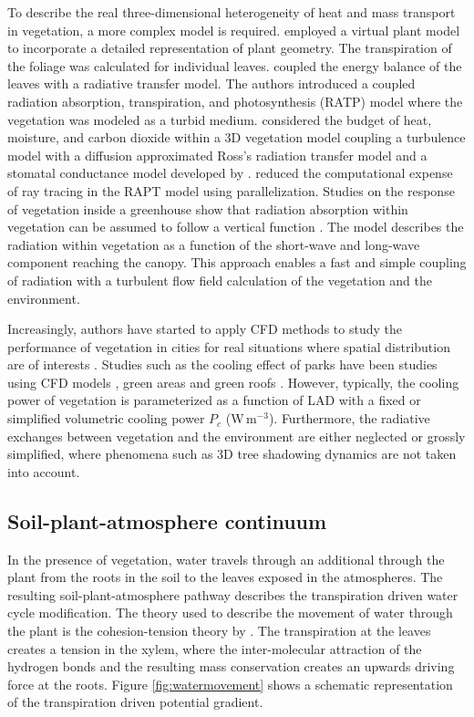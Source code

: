 To describe the real three-dimensional heterogeneity of heat and mass transport in vegetation, a more complex model is required. \cite{Dauzat2001} employed a virtual plant model to incorporate a detailed representation of plant geometry. The transpiration of the foliage was calculated for individual leaves. \cite{Sinoquet2001} coupled the energy balance of the leaves with a radiative transfer model. The authors introduced a coupled radiation absorption, transpiration, and photosynthesis (RATP) model where the vegetation was modeled as a turbid medium. \cite{Hiraoka2005} considered the budget of heat, moisture, and carbon dioxide within a 3D vegetation model coupling a turbulence model with a diffusion approximated Ross’s radiation transfer model and a stomatal conductance model developed by \cite{Colla}. \cite{Bailey2014} reduced the computational expense of ray tracing in the RAPT model using parallelization. Studies on the response of vegetation inside a greenhouse show that radiation absorption within vegetation can be assumed to follow a vertical function \citep{Majdoubi2009,Kichah2012}. The model describes the radiation within vegetation as a function of the short-wave and long-wave component reaching the canopy. This approach enables a fast and simple coupling of radiation with a turbulent flow field calculation of the vegetation and the environment.
	
Increasingly, authors have started to apply CFD methods to study the performance of vegetation in cities for real situations where spatial distribution are of interests \citep{Gromke2014,Yoshida2006,Buccolieri2018}. Studies such as the cooling effect of parks have been studies using CFD models \citep{Toparlar2017a}, green areas \citep{Honjo1990,Ng2012} and green roofs \citep{Alexandri2008}. However, typically, the cooling power of vegetation is parameterized as a function of LAD with a fixed or simplified volumetric cooling power $P_c$ (W\,m$^{-3}$). Furthermore, the radiative exchanges between vegetation and the environment are either neglected or grossly simplified, where phenomena such as 3D tree shadowing dynamics are not taken into account.


\subsection{Soil-plant-atmosphere continuum}

In the presence of vegetation, water travels through an additional through the plant from the roots in the soil to the leaves exposed in the atmospheres. The resulting soil-plant-atmosphere pathway describes the transpiration driven water cycle modification. The theory used to describe the movement of water through the plant is the cohesion-tension theory by \cite{Dixon1895}. The transpiration at the leaves creates a tension in the xylem, where the inter-molecular attraction of the hydrogen bonds and the resulting mass conservation creates an upwards driving force at the roots. Figure \ref{fig:watermovement} shows a schematic representation of the transpiration driven potential gradient.  

